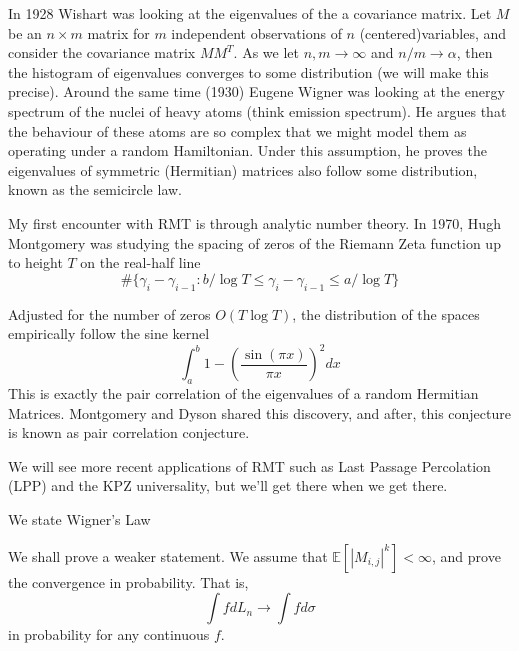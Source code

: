 In 1928 Wishart was looking at the eigenvalues of the a covariance matrix. Let $M$ be an $n \times m$ matrix for $m$ independent observations of $n$ (centered)variables, and consider the covariance matrix $MM^T$. As we let $n,m\to \infty$ and $n/m\to \alpha$, then the histogram of eigenvalues converges to some distribution (we will make this precise). Around the same time (1930) Eugene Wigner was looking at the energy spectrum of the nuclei of heavy atoms (think emission spectrum). He argues that the behaviour of these atoms are so complex that we might model them as operating under a random Hamiltonian. Under this assumption, he proves the eigenvalues of symmetric (Hermitian) matrices also follow some distribution, known as the semicircle law.

My first encounter with RMT is through analytic number theory. In 1970, Hugh Montgomery was studying the spacing of zeros of the Riemann Zeta function up to height $T$ on the real-half line \[
\# \{\gamma_i-\gamma_{i-1} : b/\log T \leq \gamma_i-\gamma_{i-1}\leq a/\log T  \}
\]

Adjusted for the number of zeros $O(T\log T)$, the distribution of the spaces empirically follow the sine kernel
\[
\int_a^b 1-\left(\frac{\sin(\pi x)}{\pi x}\right)^2 dx
\]
This is exactly the pair correlation of the eigenvalues of a random Hermitian Matrices. Montgomery and Dyson shared this discovery, and after, this conjecture is known as pair correlation conjecture.

We will see more recent applications of RMT such as Last Passage Percolation (LPP) and the KPZ universality, but we'll get there when we get there.


We state Wigner's Law 


We shall prove a weaker statement. We assume that $\mathbb{E}[|M_{i,j}|^k]<\infty$, and prove the convergence in probability. That is,\[
\int f dL_n \to \int f d\sigma
\]
in probability for any continuous $f$.

